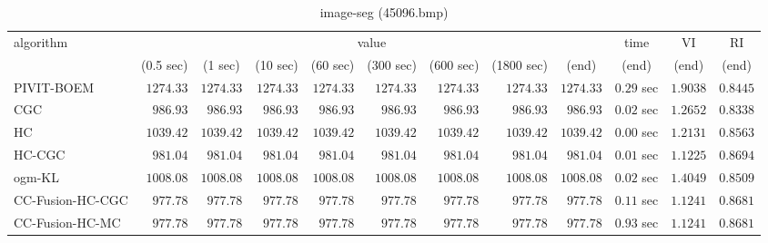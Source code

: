 \begin{table}[H]
\scriptsize
\centering
\caption{image-seg (45096.bmp)}
\label{tab:anytimetable-image-seg-45096.bmp}
\begin{tabular}{lrrrrrrrrrrr}
\toprule
           algorithm &                                   \multicolumn{8}{c}{value} & \multicolumn{1}{c}{time}    & \multicolumn{1}{c}{VI}  & \multicolumn{1}{c}{RI} \\  
\cmidrule(lr){2-9}\cmidrule(lr){10-10} \cmidrule(lr){11-11} \cmidrule(lr){12-12}   
                     & \multicolumn{1}{c}{(0.5 sec)} & \multicolumn{1}{c}{(1 sec)} & \multicolumn{1}{c}{(10 sec)} & \multicolumn{1}{c}{(60 sec)} & \multicolumn{1}{c}{(300 sec)} & \multicolumn{1}{c}{(600 sec)} & \multicolumn{1}{c}{(1800 sec)} & \multicolumn{1}{c}{(end)} & \multicolumn{1}{c}{(end)}    & \multicolumn{1}{c}{(end)}   & \multicolumn{1}{c}{(end)}  \\ \midrule 
          PIVIT-BOEM & $      1274.33$ & $      1274.33$ & $      1274.33$ & $      1274.33$ & $      1274.33$ & $      1274.33$ & $      1274.33$ & $      1274.33$ & $         0.29$ sec    & $       1.9038$  & $       0.8445$ \\ 
                 CGC & $       986.93$ & $       986.93$ & $       986.93$ & $       986.93$ & $       986.93$ & $       986.93$ & $       986.93$ & $       986.93$ & $         0.02$ sec    & $       1.2652$  & $       0.8338$ \\ 
                  HC & $      1039.42$ & $      1039.42$ & $      1039.42$ & $      1039.42$ & $      1039.42$ & $      1039.42$ & $      1039.42$ & $      1039.42$ & $         0.00$ sec    & $       1.2131$  & $       0.8563$ \\ 
              HC-CGC & $       981.04$ & $       981.04$ & $       981.04$ & $       981.04$ & $       981.04$ & $       981.04$ & $       981.04$ & $       981.04$ & $         0.01$ sec    & $       1.1225$  & $       0.8694$ \\ 
              ogm-KL & $      1008.08$ & $      1008.08$ & $      1008.08$ & $      1008.08$ & $      1008.08$ & $      1008.08$ & $      1008.08$ & $      1008.08$ & $         0.02$ sec    & $       1.4049$  & $       0.8509$ \\ 
    CC-Fusion-HC-CGC & $       977.78$ & $       977.78$ & $       977.78$ & $       977.78$ & $       977.78$ & $       977.78$ & $       977.78$ & $       977.78$ & $         0.11$ sec    & $       1.1241$  & $       0.8681$ \\ 
     CC-Fusion-HC-MC & $       977.78$ & $       977.78$ & $       977.78$ & $       977.78$ & $       977.78$ & $       977.78$ & $       977.78$ & $       977.78$ & $         0.93$ sec    & $       1.1241$  & $       0.8681$ \\ 

\end{tabular}
\end{table}

